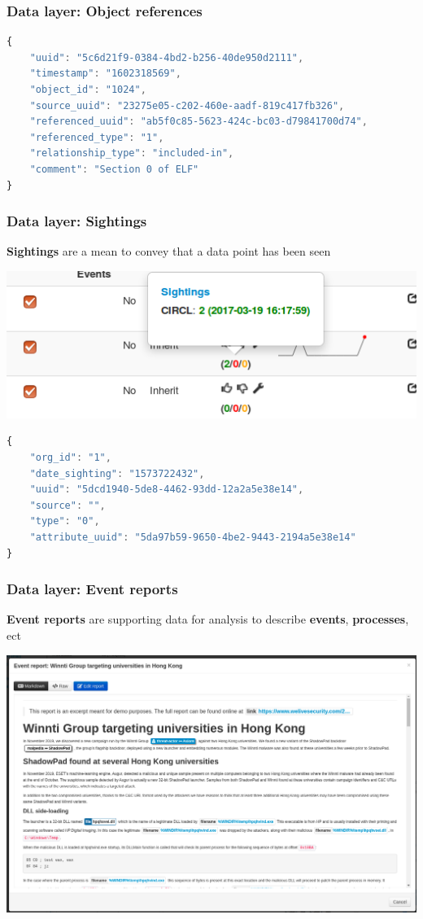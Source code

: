 \begin{frame}[fragile]
    \frametitle{Data layer: Object references}
    \begin{lstlisting}[language=javascript,firstnumber=1]
{
    "uuid": "5c6d21f9-0384-4bd2-b256-40de950d2111",
    "timestamp": "1602318569",
    "object_id": "1024",
    "source_uuid": "23275e05-c202-460e-aadf-819c417fb326",
    "referenced_uuid": "ab5f0c85-5623-424c-bc03-d79841700d74",
    "referenced_type": "1",
    "relationship_type": "included-in",
    "comment": "Section 0 of ELF"
}
\end{lstlisting}
\end{frame}

\begin{frame}[fragile]
    \frametitle{Data layer: Sightings}
    {\bf Sightings} are a mean to convey that a data point has been seen
    \begin{center}
        \includegraphics[width=1.0\linewidth]{screenshots/sighting-n.png}
    \end{center}
    \begin{lstlisting}[language=javascript,firstnumber=1]
{
    "org_id": "1",
    "date_sighting": "1573722432",
    "uuid": "5dcd1940-5de8-4462-93dd-12a2a5e38e14",
    "source": "",
    "type": "0",
    "attribute_uuid": "5da97b59-9650-4be2-9443-2194a5e38e14"
}
\end{lstlisting}
\end{frame}

\begin{frame}[fragile]
    \frametitle{Data layer: Event reports}
    {\bf Event reports} are supporting data for analysis to describe {\bf events}, {\bf processes}, ect
    \begin{center}
        \includegraphics[width=0.9\linewidth]{screenshots/event-report.png}
    \end{center}
\end{frame}

